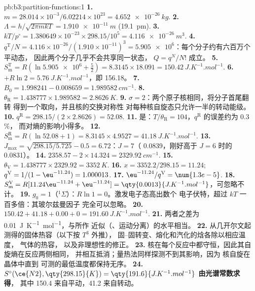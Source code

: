 \begin{solution}{pb:b3:partition-functions:1}
\textbf{1.} $m = 28.014\times10^{-3}/6.02214\times10^{23} = \qty{4.652e-26}{kg}$.
\textbf{2.} $\Lambda = h/\sqrt{2\pi mkT} = \qty{1.910e-11}{m}$ (\qty{19.1}{pm}).
\textbf{3.} $kT/p^\circ = 1.380649\times10^{-23} \times 298.15/10^5 = \qty{4.116e-26}{m^3}$.
\textbf{4.} $q^{\mathrm T}/N = 4.116\times10^{-26}/(1.910\times10^{-11})^3 = \num{5.905e6}$：每个分子约有六百万个平动态，
因此两个分子几乎不会共享同一状态，
$Q = q^N/N!$ 成立。
\textbf{5.} $S^{\mathrm T}_{\mathrm m} = R(\ln\num{5.905e6} + \frac52) = 8.3145 \times 18.091 = \qty{150.42}{J.K^{-1}.mol^{-1}}$.
\textbf{6.} $+R\ln2 = \qty{5.76}{J.K^{-1}.mol^{-1}}$，即 \num{156.18}。
\textbf{7.} $B_0 = 1.998241 - 0.008659 = \qty{1.989582}{cm^{-1}}$.
\textbf{8.} $\theta_{\mathrm R} = 1.438777 \times 1.989582 = \qty{2.8626}{K}$.
\textbf{9.} $\sigma = 2$：两个原子核相同，将分子首尾翻转
得到一个取向，并且核的交换对称性
对每种核自旋态只允许一半的转动能级。
\textbf{10.} $q^{\mathrm R} = 298.15/(2 \times 2.8626) = 52.08$.
\textbf{11.} 是：$T/\theta_{\mathrm R} = 104$，$q^{\mathrm R}$ 的误差约为 0.3\,\%，
而对熵的影响小得多。
\textbf{12.} $S^{\mathrm R}_{\mathrm m} = R(\ln52.08 + 1) = 8.3145 \times 4.9527 = \qty{41.18}{J.K^{-1}.mol^{-1}}$.
\textbf{13.} $J_{\max} = \sqrt{298.15/5.725} - 0.5 = 6.72$：$J = 7$（ 0.0839，刚好高于
$J = 6$ 时的 0.0831）。
\textbf{14.} $2358.57 - 2 \times 14.324 = \qty{2329.92}{cm^{-1}}$.
\textbf{15.} $\theta_{\mathrm V} = 1.438777 \times 2329.92 = \qty{3352}{K}$.
\textbf{16.} $x = 3352.2/298.15 = 11.24$; $q^{\mathrm V} = 1/(1 - \eu^{-11.24}) = 1.000013$.
\textbf{17.} $\eu^{-11.24}/q^{\mathrm V} = \num{1.3e-5}$.
\textbf{18.} $S^{\mathrm V}_{\mathrm m} = R[11.24\eu^{-11.24} + \eu^{-11.24}] = \qty{0.0013}{J.K^{-1}.mol^{-1}}$，可忽略不计。
\textbf{19.} $g_0 = 1$（${}^1\Sigma$）：$R\ln1 = 0$。激发电子态高出数个
电子伏特，超过 $kT$ 一百多倍：其玻尔兹曼因子
完全可以忽略。
\textbf{20.} $150.42 + 41.18 + 0.00 + 0 = \qty{191.60}{J.K^{-1}.mol^{-1}}$.
\textbf{21.} 两者之差为 \qty{0.01}{J.K^{-1}.mol^{-1}}，与所作
近似（、运动分离）的水平相当。
\textbf{22.} 从几开尔文起测得的固体热容（以下按 $T^3$ 外推），
固–固转变、熔化和汽化的焓各除以相应温度，
气体的热容，
以及非理想性的修正。
\textbf{23.} 核在每个反应中都守恒，因此其自旋熵在反应两侧相同，
并相互抵消；量热法同样探测不到其影响，因为
核自旋在晶体中直到
可测的最低温度都保持无序。
\textbf{24.} \textbf{$S^\circ(\ce{N2}, \qty{298.15}{K}) = \qty{191.6}{J.K^{-1}.mol^{-1}}$ 由光谱常数求得}，
其中 150.4 来自平动，41.2 来自转动。
\end{solution}
